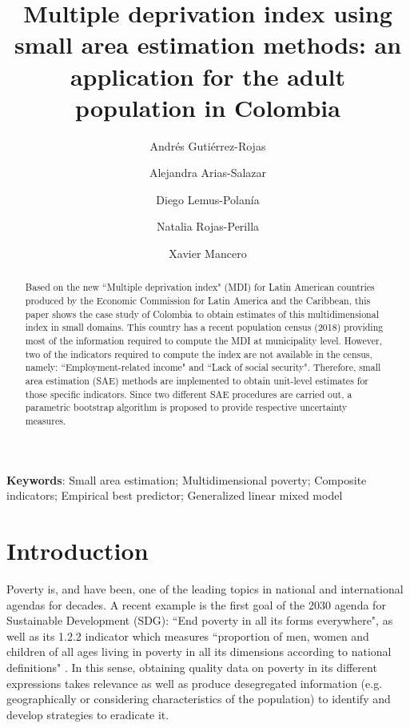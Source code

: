 \documentclass[a4paper, 11pt]{article}
\title{Multiple deprivation index using small area estimation methods: an application for the adult population in Colombia}
\author[1]{Andrés Gutiérrez-Rojas}
\author[2]{Alejandra Arias-Salazar}
\author[1]{Diego Lemus-Polanía}
\author[3]{Natalia Rojas-Perilla}
\author[1]{Xavier Mancero}
\affil[1]{Economic Commission for Latin America and the Caribbean}
\affil[2]{Freie Universität Berlin}
\affil[3]{United Arab Emirates University}
\date{}
\begin{document}
\maketitle


\begin{abstract}\small

Based on the new ``Multiple deprivation index" (MDI) for Latin American countries produced by the Economic Commission for Latin America and the Caribbean, this paper shows the case study of Colombia to obtain estimates of this multidimensional index in small domains. This country has a recent population census (2018) providing most of the information required to compute the MDI at municipality level. However,  two of the indicators required to compute the index are not available in the census, namely: ``Employment-related income" and ``Lack of social security". Therefore, small area estimation (SAE) methods are implemented to obtain unit-level estimates for those specific indicators. Since two different SAE procedures are carried out, a parametric bootstrap algorithm is proposed to provide respective uncertainty measures.

\end{abstract}

{{\bf \noindent Keywords}: Small area estimation; Multidimensional poverty; Composite indicators; Empirical best predictor; Generalized linear mixed model}	

\clearpage

\section{Introduction}


Poverty is, and have been, one of the leading topics in national and international agendas for decades. A recent example is the first goal of the 2030 agenda for Sustainable Development (SDG): ``End poverty in all its forms everywhere", as well as its 1.2.2 indicator which measures ``proportion of men, women and children of all ages living in poverty in all its dimensions according to national definitions" \citep{UnitedNationsGeneralAssembly2015ResDevelopment}. In this sense,  obtaining quality data on poverty in its different expressions takes relevance as well as produce desegregated information (e.g. geographically or considering characteristics of the population) to identify and develop strategies to eradicate it.  
\end{document}
